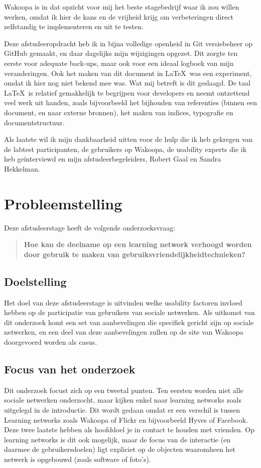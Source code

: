 \documentclass[a4paper, 10pt, pdftex]{report}
\begin{document}
    Wakoopa is in dat opzicht voor mij het beste stagebedrijf waar ik zou willen werken, omdat ik hier de kans en de vrijheid krijg om verbeteringen direct zelfstandig te implementeren en uit te testen.

    Deze afstudeeropdracht heb ik in bijna volledige openheid in Git versiebeheer op GitHub gemaakt, en daar dagelijks mijn wijzigingen opgezet. Dit zorgte ten eerste voor adequate back-ups, maar ook voor een ideaal logboek van mijn veranderingen. Ook het maken van dit document in \LaTeX~was een experiment, omdat ik hier nog niet bekend mee was. Wat mij betreft is dit geslaagd. De taal \LaTeX~is relatief gemakkelijk te begrijpen voor developers en neemt ontzettend veel werk uit handen, zoals bijvoorbeeld het bijhouden van referenties (binnen een document, en naar externe bronnen), het maken van indices, typografie en documentstructuur.

    Als laatste wil ik mijn dankbaarheid uitten voor de hulp die ik heb gekregen van de labtest participanten, de gebruikers op Wakoopa, de usability experts die ik heb ge\"interviewd en mijn afstudeerbegeleiders, Robert Gaal en Sandra Hekkelman.

  \newpage
  \section*{Probleemstelling}
    Deze afstudeerstage heeft de volgende onderzoeksvraag:
    \begin{quotation}
     \textbf{Hoe kan de deelname op een learning network verhoogd worden door gebruik te maken van gebruiksvriendelijkheidtechnieken?}
    \end{quotation}

    \subsection*{Doelstelling}

    Het doel van deze afstudeerstage is uitvinden welke usability factoren invloed hebben op de participatie van gebruikers van sociale netwerken. Als uitkomst van dit onderzoek komt een set van aanbevelingen die specifiek gericht zijn op sociale netwerken, en een deel van deze aanbevelingen zullen op de site van Wakoopa doorgevoerd worden als casus.

  \subsection*{Focus van het onderzoek}
    Dit onderzoek focust zich op een tweetal punten. Ten eersten worden niet alle sociale netwerken onderzocht, maar kijken enkel naar learning networks zoals uitgelegd in de introductie. Dit wordt gedaan omdat er een verschil is tussen Learning networks zoals Wakoopa of Flickr en bijvoorbeeld Hyves of Facebook. Deze twee laatste hebben als hoofddoel je in contact te houden met vrienden. Op learning networks is dit ook mogelijk, maar de focus van de interactie (en daarmee de gebruikersdoelen) ligt expliciet op de objecten waaromheen het netwerk is opgebouwd (zoals software of foto's).
\end{document}

